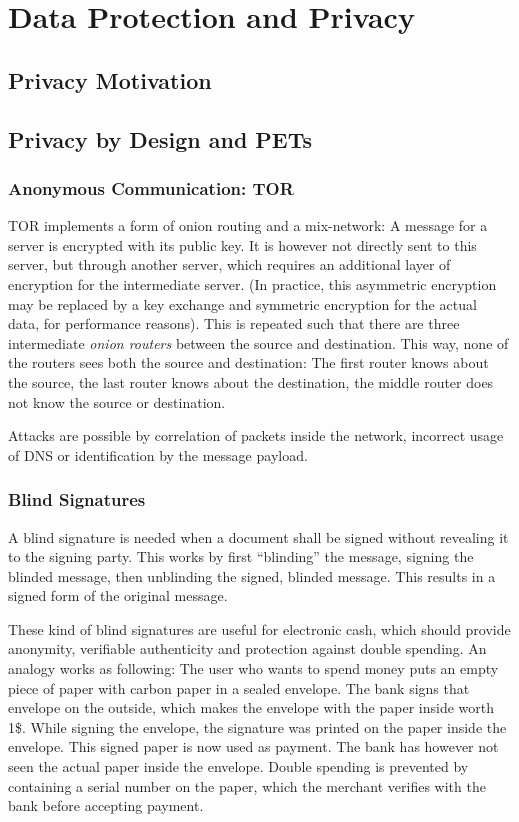 \chapter{Data Protection and Privacy}
\section{Privacy Motivation}

\section{Privacy by Design and PETs}
\subsection{Anonymous Communication: TOR}
TOR implements a form of onion routing and a mix-network: A message for a server
is encrypted with its public key. It is however not directly sent to this
server, but through another server, which requires an additional layer of
encryption for the intermediate server. (In practice, this asymmetric encryption
may be replaced by a key exchange and symmetric encryption for the actual data,
for performance reasons). This is repeated such that there are three
intermediate \textit{onion routers} between the source and destination. This
way, none of the routers sees both the source and destination: The first router
knows about the source, the last router knows about the destination, the middle
router does not know the source or destination.

Attacks are possible by correlation of packets inside the network, incorrect
usage of DNS or identification by the message payload.

\subsection{Blind Signatures}
A blind signature is needed when a document shall be signed without revealing it
to the signing party. This works by first ``blinding'' the message, signing the
blinded message, then unblinding the signed, blinded message. This results in a
signed form of the original message.

These kind of blind signatures are useful for electronic cash, which should
provide anonymity, verifiable authenticity and protection against double
spending. An analogy works as following: The user who wants to spend money puts
an empty piece of paper with carbon paper in a sealed envelope. The bank signs
that envelope on the outside, which makes the envelope with the paper inside
worth 1\$. While signing the envelope, the signature was printed on the paper
inside the envelope. This signed paper is now used as payment. The bank has
however not seen the actual paper inside the envelope. Double spending is
prevented by containing a serial number on the paper, which the merchant
verifies with the bank before accepting payment.

